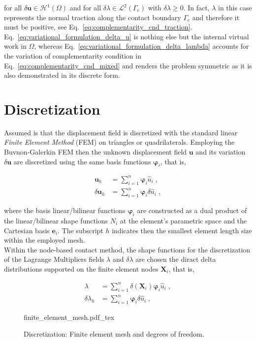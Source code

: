 \documentclass[10pt,a4paper]{article}
\begin{document}
for all $\delta \mathbf{u} \in \boldsymbol{\mathcal{H}}^1 (\Omega)$ and for all $\delta \lambda \in \mathcal{L}^2(\Gamma_{\text{c}})$ with $\delta \lambda \ge 0$. In fact, $\lambda$ in this case represents the normal traction along the contact boundary $\Gamma_{\text{c}}$ and therefore it must be positive, see Eq.~\eqref{eq:complementarity_cnd_traction}. Eq.~\eqref{eq:variational_formulation_delta_u} is nothing else but the internal virtual work in $\Omega$, whereas Eq.~\eqref{eq:variational_formulation_delta_lambda} accounts for the variation of complementarity condition in Eq.~\eqref{eq:complementarity_cnd_mixed} and renders the problem symmetric as it is also demonstrated in its discrete form.

\section{Discretization}

Assumed is that the displacement field is discretized with the standard linear \textit{Finite Element Method} (FEM) on triangles or quadrilaterals. Employing the Buvnon-Galerkin FEM then the unknown displacement field $\mathbf{u}$ and its variation $\delta \mathbf{u}$ are discretized using the same basis functions $\boldsymbol{\varphi}_i$, that is,

\begin{subequations}
	\begin{alignat}{1}
		\mathbf{u}_h &= \sum_{i = 1}^n \boldsymbol{\varphi}_i \hat{u}_i \;, \label{eq:discretization_u} \\
		\delta \mathbf{u}_h &= \sum_{i = 1}^n \boldsymbol{\varphi}_i \delta\hat{u}_i \;, \label{eq:discretization_delta_u}
	\end{alignat}
\end{subequations}

where the basis linear/bilinear functions $\boldsymbol{\varphi}_i$ are constructed as a dual product of the linear/bilinear shape functions $N_i$ at the element's parametric space and the Cartesian basis $\mathbf{e}_i$. The subscript $h$ indicates then the smallest element length size within the employed mesh.\\

Within the node-based contact method, the shape functions for the discretization of the Lagrange Multipliers fields $\lambda$ and $\delta \lambda$ are chosen the diract delta distributions supported on the finite element nodes $\mathbf{X}_i$, that is,

\begin{subequations}
	\begin{alignat}{1}
		\lambda &= \sum_{i = 1}^n \delta(\mathbf{X}_i) \boldsymbol{\varphi}_i \hat{u}_i \;, \label{eq:discretization_u} \\
		\delta \lambda_h &= \sum_{i = 1}^n \boldsymbol{\varphi}_i \delta\hat{u}_i \;, \label{eq:discretization_delta_u}
	\end{alignat}
\end{subequations}

\begin{figure}[!t]
	\centering
	\footnotesize
    \def\svgwidth{0.7\textwidth}{finite_element_mesh.pdf_tex}
	\caption{Discretization: Finite element mesh and degrees of freedom.}
	\label{im:finite_element_mesh}
\end{figure}
\end{document}
